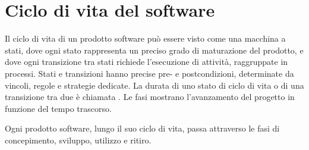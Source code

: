 \section{Ciclo di vita del software}
Il ciclo di vita di un prodotto software può essere visto come una macchina a stati, dove ogni stato rappresenta un preciso grado di maturazione del prodotto, e dove ogni transizione tra stati richiede l'esecuzione di attività, raggruppate in processi. Stati e transizioni hanno precise pre- e postcondizioni, determinate da vincoli, regole e strategie dedicate. La durata di uno stato di ciclo di vita o di una transizione tra due è chiamata . Le fasi mostrano l'avanzamento del progetto in funzione del tempo trascorso.

Ogni prodotto software, lungo il suo ciclo di vita, passa attraverso le fasi di concepimento, sviluppo, utilizzo e ritiro. 

